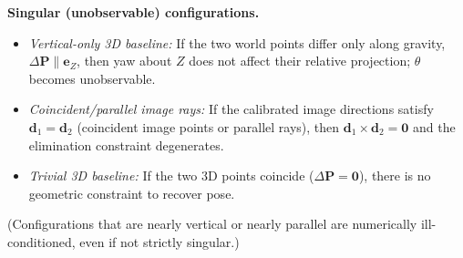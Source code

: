 \documentclass[12pt]{article}
\begin{document}
\textbf{Singular (unobservable) configurations.}
\begin{itemize}
  \item \emph{Vertical-only 3D baseline:} If the two world points differ only along gravity,
  \(\Delta\mathbf{P}\parallel \mathbf{e}_Z\), then yaw about \(Z\) does not affect their relative
  projection; \(\theta\) becomes unobservable.
  \item \emph{Coincident/parallel image rays:} If the calibrated image directions satisfy
  \(\mathbf{d}_1=\mathbf{d}_2\) (coincident image points or parallel rays),
  then \(\mathbf{d}_1\times \mathbf{d}_2=\mathbf{0}\) and the elimination constraint degenerates.
  \item \emph{Trivial 3D baseline:} If the two 3D points coincide (\(\Delta\mathbf{P}=\mathbf{0}\)),
  there is no geometric constraint to recover pose.
\end{itemize}
(Configurations that are nearly vertical or nearly parallel are numerically ill-conditioned,
even if not strictly singular.)
\end{document}
